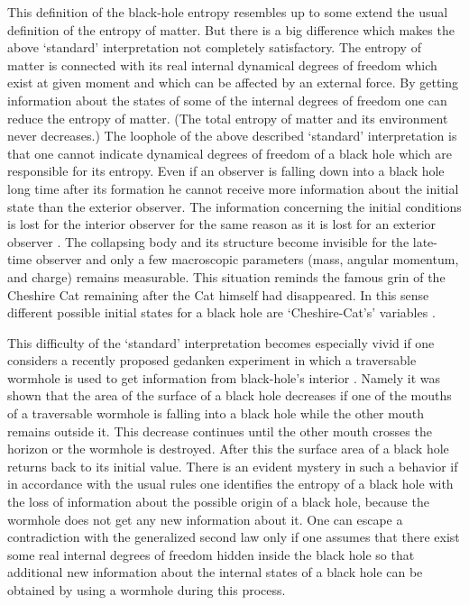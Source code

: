 \documentclass[superscriptaddress,showpacs,preprintnumbers,amsmath,amssymb,
nofootinbib,twocolumn,aps,prd,10pt]{revtex4-1}
\begin{document}
This  definition  of  the  black-hole  entropy  resembles up to some
extend the usual definition of the  entropy of matter. But there is  a
big  difference  which  makes  the above `standard' interpretation not
completely  satisfactory.   The entropy of  matter is connected   with
its real internal dynamical degrees  of  freedom  which exist at given
moment and which can be affected by an external force. By  getting
information   about  the  states  of  some of the
internal degrees of freedom one can  reduce the  entropy  of   matter.
(The   total   entropy   of   matter   and     its  environment never
decreases.) The loophole of the above described  `standard'
interpretation is that  one cannot  indicate dynamical   degrees
of freedom of a black hole which are responsible for its entropy.
Even if an   observer is
falling  down into  a  black  hole  long  time  after  its   formation
he cannot receive   more information   about the  initial state  than the
exterior observer. The  information concerning the  initial conditions
is lost for the interior observer for the same  reason as it is   lost
for  an  exterior   observer  \cite{DoNo:78}. The collapsing body
and its structure become invisible for the late-time observer and
only a few macroscopic parameters (mass, angular momentum,
and charge) remains measurable. This situation
reminds the famous grin of the Cheshire Cat remaining after
the Cat himself had disappeared. In  this  sense different
possible  initial  states  for  a  black  hole  are  `Cheshire-Cat's'
variables \cite{note1}.

This difficulty  of the  `standard' interpretation  becomes especially
vivid if one considers a recently  proposed  gedanken  experiment   in
which  a  traversable  wormhole  is  used   to  get   information from
black-hole's interior   \cite{FrNo:93}.  Namely  it was shown  that the
area  of  the surface   of a   black hole   decreases if   one of  the
mouths  of  a traversable wormhole   is falling  into   a black  hole
while the other mouth remains outside it.
This decrease  continues until the  other mouth   crosses the
horizon or the wormhole is destroyed.  After   this the  surface area  of
a black hole  returns back  to its initial value.  There is an  evident
mystery in such a behavior  if in accordance with the   usual rules
one identifies the  entropy of a   black hole with the loss of information
about the possible origin of a black hole, because the wormhole does
not get any new information about it.     One  can escape  a
contradiction  with   the generalized  second  law only  if   one
assumes that there exist some real internal degrees of freedom
hidden inside the black hole so that   additional new information
about     the internal states   of  a black hole can be obtained
by using a wormhole during this process.
\end{document}
